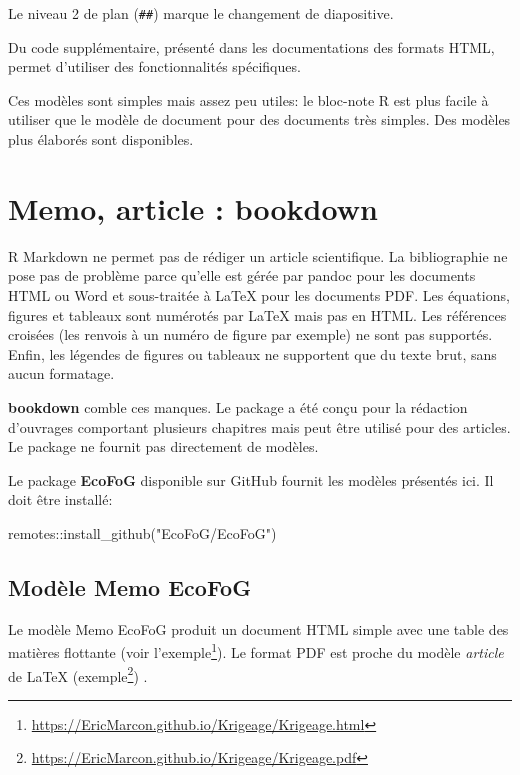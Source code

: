 \documentclass[
  11pt,
  french,
  a4paper,
  extrafontsizes,onecolumn,openright
  ]{memoir}
\newenvironment{Shaded}{\begin{snugshade}}{\end{snugshade}}
\newcommand{\FunctionTok}[1]{\textcolor[rgb]{0.00,0.00,0.00}{#1}}
\newcommand{\NormalTok}[1]{#1}
\newcommand{\SpecialCharTok}[1]{\textcolor[rgb]{0.00,0.00,0.00}{#1}}
\newcommand{\StringTok}[1]{\textcolor[rgb]{0.31,0.60,0.02}{#1}}
\begin{document}
Le niveau 2 de plan (\texttt{\#\#}) marque le changement de diapositive.

Du code supplémentaire, présenté dans les documentations des formats HTML, permet d'utiliser des fonctionnalités spécifiques.

Ces modèles sont simples mais assez peu utiles: le bloc-note R est plus facile à utiliser que le modèle de document pour des documents très simples.
Des modèles plus élaborés sont disponibles.

\hypertarget{memo-article-bookdown}{%
\section{Memo, article : bookdown}\label{memo-article-bookdown}}

R Markdown ne permet pas de rédiger un article scientifique.
La bibliographie ne pose pas de problème parce qu'elle est gérée par pandoc pour les documents HTML ou Word et sous-traitée à LaTeX pour les documents PDF.
Les équations, figures et tableaux sont numérotés par LaTeX mais pas en HTML.
Les références croisées (les renvois à un numéro de figure par exemple) ne sont pas supportés.
Enfin, les légendes de figures ou tableaux ne supportent que du texte brut, sans aucun formatage.

\textbf{bookdown} comble ces manques.
Le package a été conçu pour la rédaction d'ouvrages comportant plusieurs chapitres mais peut être utilisé pour des articles.
Le package ne fournit pas directement de modèles.

Le package \textbf{EcoFoG} disponible sur GitHub fournit les modèles présentés ici.
Il doit être installé:

\scriptsize

\begin{Shaded}
\begin{Highlighting}[]
\NormalTok{remotes}\SpecialCharTok{::}\FunctionTok{install\_github}\NormalTok{(}\StringTok{"EcoFoG/EcoFoG"}\NormalTok{)}
\end{Highlighting}
\end{Shaded}

\normalsize

\hypertarget{sec:memo}{%
\subsection{Modèle Memo EcoFoG}\label{sec:memo}}

Le modèle Memo EcoFoG produit un document HTML simple avec une table des matières flottante (voir l'exemple\footnote{\url{https://EricMarcon.github.io/Krigeage/Krigeage.html}}).
Le format PDF est proche du modèle \emph{article} de LaTeX (exemple\footnote{\url{https://EricMarcon.github.io/Krigeage/Krigeage.pdf}})
.
\end{document}
